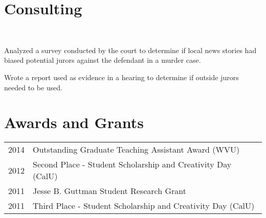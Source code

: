 \documentclass[letterpaper]{deedy-resume} %
\begin{document}
\begin{minipage}[t]{0.63\textwidth}
\sectionspace %
\vspace{-6pt}
\section{Consulting}
\\
\begin{tightitemize}
\item Analyzed a survey conducted by the court to determine if
  local news stories had biased potential jurors against the defendant in a
  murder case.
\item Wrote a report used as evidence in a hearing to determine if
  outside jurors needed to be used.
\end{tightitemize}

\sectionspace %


\vspace{-7pt}
\section{Awards and Grants} 

\begin{tabular}{rl}
2014 & Outstanding Graduate Teaching Assistant Award (WVU)\\
2012 & Second Place - Student Scholarship and Creativity Day (CalU)\\
2011 & Jesse B. Guttman Student Research Grant\\
2011 & Third Place - Student Scholarship and Creativity Day (CalU)\\
\end{tabular}

\sectionspace %




\end{minipage} %
\end{document}
